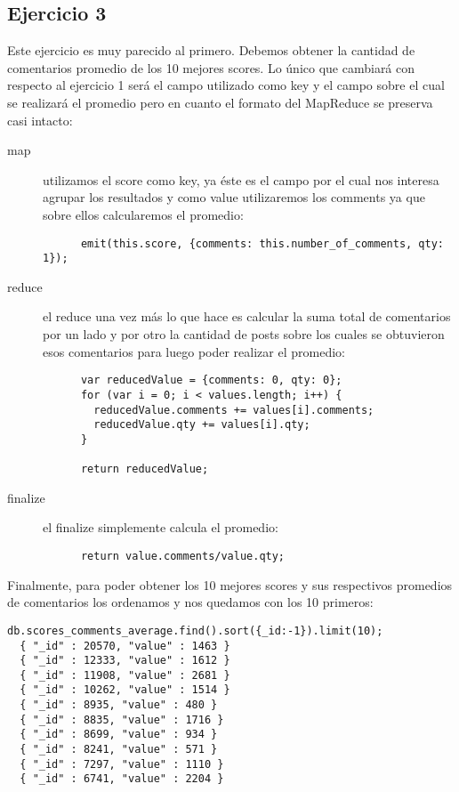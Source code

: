 \subsection{Ejercicio 3}
Este ejercicio es muy parecido al primero. Debemos obtener la cantidad de
comentarios promedio de los 10 mejores scores. Lo único que cambiará con
respecto al ejercicio 1 será el campo utilizado como key y el campo
sobre el cual se realizará el promedio pero en cuanto el formato del MapReduce
se preserva casi intacto:
\begin{description}
  \item[map] utilizamos el score como key, ya éste es el campo por el cual 
    nos interesa agrupar los resultados y como value utilizaremos los comments
    ya que sobre ellos calcularemos el promedio:
    \begin{lstlisting}
      emit(this.score, {comments: this.number_of_comments, qty: 1});
    \end{lstlisting}
  \item[reduce] el reduce una vez más lo que hace es calcular la suma total
    de comentarios por un lado y por otro la cantidad de posts sobre los
    cuales se obtuvieron esos comentarios para luego poder realizar el
    promedio:
    \begin{lstlisting}
      var reducedValue = {comments: 0, qty: 0};
      for (var i = 0; i < values.length; i++) {
        reducedValue.comments += values[i].comments;
        reducedValue.qty += values[i].qty;
      }

      return reducedValue;
    \end{lstlisting}
  \item[finalize] el finalize simplemente calcula el promedio:
    \begin{lstlisting}
      return value.comments/value.qty;
    \end{lstlisting}
\end{description}
Finalmente, para poder obtener los 10 mejores scores y sus respectivos
promedios de comentarios los ordenamos y nos quedamos con los 10 primeros:
\begin{lstlisting}
db.scores_comments_average.find().sort({_id:-1}).limit(10);
  { "_id" : 20570, "value" : 1463 }
  { "_id" : 12333, "value" : 1612 }
  { "_id" : 11908, "value" : 2681 }
  { "_id" : 10262, "value" : 1514 }
  { "_id" : 8935, "value" : 480 }
  { "_id" : 8835, "value" : 1716 }
  { "_id" : 8699, "value" : 934 }
  { "_id" : 8241, "value" : 571 }
  { "_id" : 7297, "value" : 1110 }
  { "_id" : 6741, "value" : 2204 }
\end{lstlisting}

